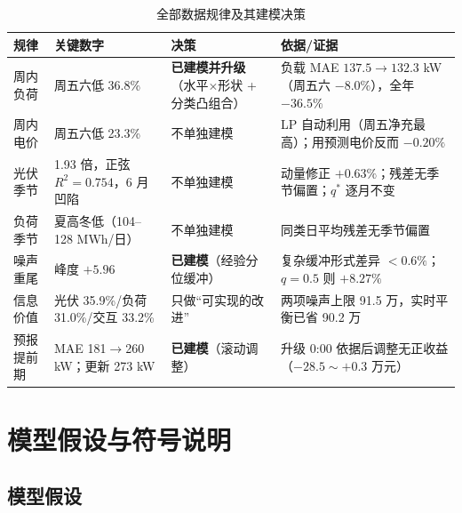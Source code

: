 \documentclass[12pt,a4paper,fontset=fandol]{ctexart}
\begin{document}
\begin{table}[htbp]
\centering
\caption{全部数据规律及其建模决策}
\label{tab:patterns}
\begin{tabularx}{\textwidth}{@{}p{2.5cm}p{3.6cm}p{2.4cm}X@{}}
\toprule
规律 & 关键数字 & 决策 & 依据/证据 \\
\midrule
周内负荷 & 周五六低 36.8\% & \textbf{已建模并升级}（水平$\times$形状 + 分类凸组合\nobreak） & 负载 MAE $137.5\to132.3$ kW（周五六 $-8.0\%$\nobreak）\nobreak，全年 $-36.5\text{\%}$ \\
周内电价 & 周五六低 23.3\% & 不单独建模 & LP 自动利用（周五净充最高\nobreak）\nobreak；用预测电价反而 $-0.20\text{\%}$ \\
光伏季节 & 1.93 倍\nobreak，正弦 $R^2=0.754$\nobreak，6 月凹陷 & 不单独建模 & 动量修正 $+0.63\text{\%}$\nobreak；残差无季节偏置\nobreak；$q^*$ 逐月不变 \\
负荷季节 & 夏高冬低（104--128 MWh/日\nobreak） & 不单独建模 & 同类日平均残差无季节偏置 \\
噪声重尾 & 峰度 $+5.96$ & \textbf{已建模}（经验分位缓冲\nobreak） & 复杂缓冲形式差异 $<0.6\text{\%}$\nobreak；$q=0.5$ 则 $+8.27\text{\%}$ \\
信息价值 & 光伏 35.9\%/负荷 31.0\%/交互 33.2\% & 只做“可实现的改进\nobreak” & 两项噪声上限 91.5 万\nobreak，实时平衡已省 90.2 万 \\
预报提前期 & MAE 181$\to$260 kW\nobreak；更新 273 kW & \textbf{已建模}（滚动调整\nobreak） & 升级 0:00 依据后调整无正收益（$-28.5\sim+0.3$ 万元\nobreak） \\
\bottomrule
\end{tabularx}
\end{table}


\section{模型假设与符号说明}
\label{sec:assume}

\subsection{模型假设}
\end{document}
